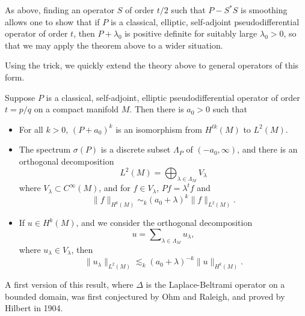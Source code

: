 \begin{remark}
    As above, finding an operator $S$ of order $t/2$ such that $P - S^*S$ is smoothing allows one to show that if $P$ is a classical, elliptic, self-adjoint pseudodifferential operator of order $t$, then $P + \lambda_0$ is positive definite for suitably large $\lambda_0 > 0$, so that we may apply the theorem above to a wider situation.
\end{remark}

Using the trick, we quickly extend the theory above to general operators of this form.

\begin{theorem}
    Suppose $P$ is a classical, self-adjoint, elliptic pseudodifferential operator of order $t = p/q$ on a compact manifold $M$. Then there is $a_0 > 0$ such that
    \begin{itemize}
        \item For all $k > 0$, $(P + a_0)^k$ is an isomorphism from $H^{tk}(M)$ to $L^2(M)$.

        \item The spectrum $\sigma(P)$ is a discrete subset $\Lambda_P$ of $(-a_0,\infty)$, and there is an orthogonal decomposition
        \[ L^2(M) = \bigoplus_{\lambda \in \Lambda_M} V_\lambda \]
        where $V_\lambda \subset C^\infty(M)$, and for $f \in V_\lambda$, $Pf = \lambda^t f$ and
        \[ \| f \|_{H^k(M)} \sim_k (a_0 + \lambda)^k \| f \|_{L^2(M)}. \]

        \item If $u \in H^k(M)$, and we consider the orthogonal decomposition
        \[ u = \sum\nolimits_{\lambda \in \Lambda_M} u_\lambda, \]
        where $u_\lambda \in V_\lambda$, then
        \[ \| u_\lambda \|_{L^2(M)} \lesssim_k (a_0 + \lambda)^{-k} \| u \|_{H^k(M)}. \]
    \end{itemize}
\end{theorem}

A first version of this result, where $\Delta$ is the Laplace-Beltrami operator on a bounded domain, was first conjectured by Ohm and Raleigh, and proved by Hilbert in 1904.

